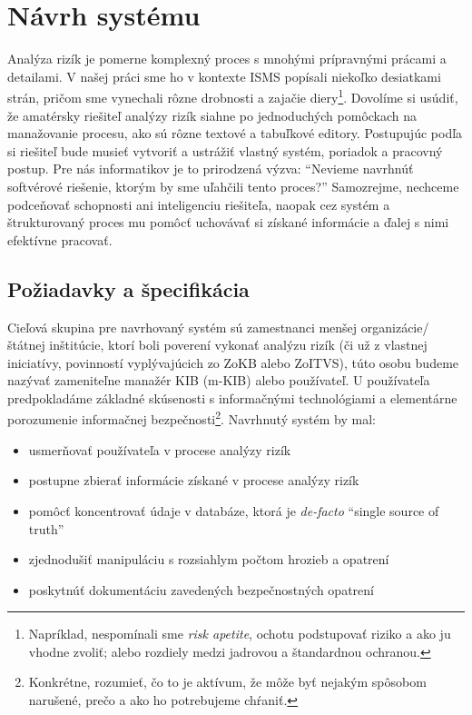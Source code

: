 \chapter{Návrh systému}
\label{chap:application}

Analýza rizík je pomerne komplexný proces s mnohými prípravnými prácami a detailami. V našej práci sme ho v kontexte ISMS
popísali niekoľko desiatkami strán, pričom sme vynechali rôzne drobnosti a zajačie diery\footnote{Napríklad, nespomínali sme
\emph{risk apetite}, ochotu podstupovať riziko a ako ju vhodne zvoliť; alebo rozdiely medzi jadrovou a štandardnou ochranou.}. Dovolíme si
usúdiť, že amatérsky riešiteľ analýzy rizík siahne po jednoduchých pomôckach na manažovanie procesu, ako sú rôzne textové a
tabuľkové editory. Postupujúc podľa \cite{BSI3} si riešiteľ bude musieť vytvoriť a ustrážiť vlastný systém, poriadok a pracovný
postup. Pre nás informatikov je to prirodzená výzva: \enquote{Nevieme navrhnúť softvérové riešenie, ktorým by sme uľahčili tento proces?}
Samozrejme, nechceme podceňovať schopnosti ani inteligenciu riešiteľa, naopak cez systém a štrukturovaný proces mu pomôcť uchovávať
si získané informácie a ďalej s nimi efektívne pracovať.

\section{Požiadavky a špecifikácia}

Cieľová skupina pre navrhovaný systém sú zamestnanci menšej organizácie/štátnej inštitúcie, ktorí boli poverení vykonať analýzu rizík
(či už z vlastnej iniciatívy, povinností vyplývajúcich zo ZoKB alebo ZoITVS), túto osobu budeme nazývať zameniteľne manažér KIB (m-KIB)
alebo používateľ. U používateľa predpokladáme základné skúsenosti s informačnými technológiami a elementárne porozumenie informačnej
bezpečnosti\footnote{Konkrétne, rozumieť, čo to je aktívum, že môže byť nejakým spôsobom narušené, prečo a ako ho potrebujeme chŕaniť.}.
Navrhnutý systém by mal:
\begin{itemize}[nosep]
    \item usmerňovať používateľa v procese analýzy rizík
    \item postupne zbierať informácie získané v procese analýzy rizík
    \item pomôcť koncentrovať údaje v databáze, ktorá je \emph{de-facto} \enquote{single source of truth}
    \item zjednodušiť manipuláciu s rozsiahlym počtom hrozieb a opatrení \cite{GSK} 
    \item poskytnúť dokumentáciu zavedených bezpečnostných opatrení
\end{itemize}

